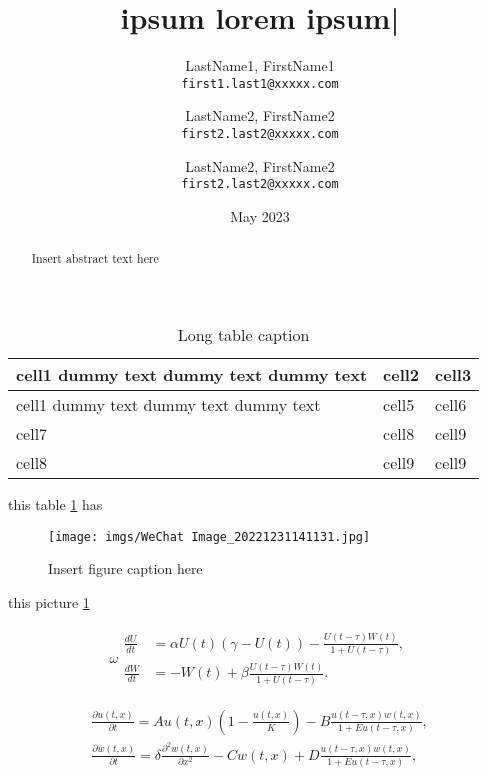 \documentclass[twocolumn]{article}
\title{\capitalisewords{\textbf{lorem}} ipsum lorem ipsum|}
\author{
  LastName1, FirstName1\\
  \texttt{first1.last1@xxxxx.com}
  \and
  LastName2, FirstName2\\
  \texttt{first2.last2@xxxxx.com}
  \and
  LastName2, FirstName2\\
  \texttt{first2.last2@xxxxx.com}
}
\date{May 2023}
\newcommand{\sumnum}[2]{
#1,#2
}
\begin{document}
\maketitle
\thispagestyle{empty}
\clearpage
{}


\begin{table}
\caption{Long table caption}
\label{tble}
\begin{center}
\begin{tabular}{ | m{5em} | m{1cm}| m{1cm} | } 
  \hline
  cell1 dummy text dummy text dummy text& cell2 & cell3 \\ 
  \hline
  cell1 dummy text dummy text dummy text & cell5 & cell6 \\ 
  \hline
  cell7 & cell8 & cell9 \\ 
  \hline
  cell8 & cell9 & cell9 \\ 
  \hline
\end{tabular}
\end{center}
\end{table}
this table \ref{tble} has

\begin{figure}[hbt!]
\centering
\texttt{[image: imgs/WeChat Image\_20221231141131.jpg]}
\caption{Insert figure caption here}
\label{fig_sim}
\end{figure}
this picture \ref{fig_sim}


\begin{abstract}
Insert abstract text here
\end{abstract}


\begin{align}\label{eq:another}
\omega
\begin{split}
\frac{dU}{dt} &=\alpha U(t)(\gamma -U(t))-\frac{U(t-\tau)W(t)}{1+U(t-\tau)},\\
\frac{dW}{dt} &=-W(t)+\beta\frac{U(t-\tau)W(t)}{1+U(t-\tau)}.
\end{split}
\end{align}

\begin{equation}
\begin{aligned}\label{eq:first}
\frac{\partial u(t,x)}{\partial t} = Au(t,x)
 \left
 (1-\frac{u(t,x)}{K}
 \right)
 -B\frac{u(t-\tau,x) w(t,x)}{1+Eu(t-\tau,x)},\\
\frac{\partial w(t,x)}{\partial t} =\delta \frac{\partial^2w(t,x)}{\partial x^2}-Cw(t,x)
+D\frac{u(t-\tau,x)w(t,x)}{1+Eu(t-\tau,x)},
\end{aligned}
\end{equation}
\end{document}

